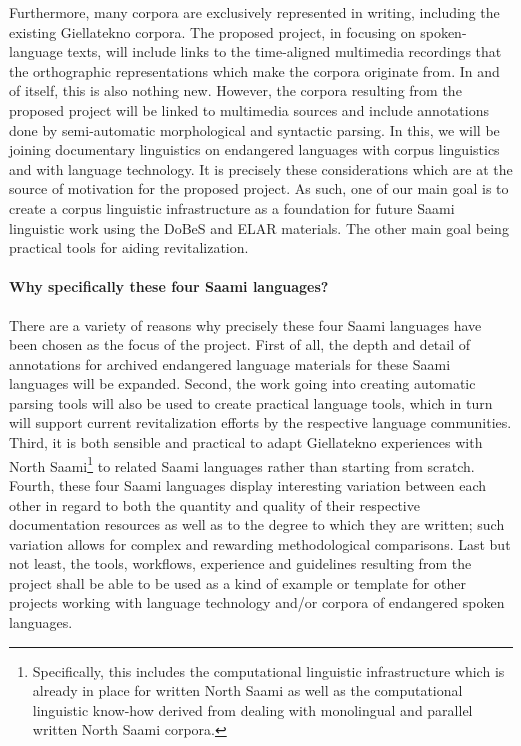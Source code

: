 \documentclass[a4paper,12pt]{article}
\begin{document}
Furthermore, many corpora are exclusively represented in writing, including the existing Giellatekno corpora. The proposed project, in focusing on spoken-language texts, will include links to the time-aligned multimedia recordings that the orthographic representations which make the corpora originate from. In and of itself, this is also nothing new. However, the corpora resulting from the proposed project will be linked to multimedia sources and include annotations done by semi-automatic morphological and syntactic parsing. In this, we will be joining documentary linguistics on endangered languages with corpus linguistics and with language technology. It is precisely these considerations which are at the source of motivation for the proposed project. As such, one of our main goal is to create a corpus linguistic infrastructure as a foundation for future Saami linguistic work using the DoBeS and ELAR materials. The other main goal being practical tools for aiding revitalization.

\paragraph{Why specifically these four Saami languages?}
There are a variety of reasons why precisely these four Saami languages have been chosen as the focus of the project. First of all, the depth and detail of annotations for archived endangered language materials for these Saami languages will be expanded. Second, the work going into creating automatic parsing tools will also be used to create practical language tools, which in turn will support current revitalization efforts by the respective language communities. Third, it is both sensible and practical to adapt Giellatekno experiences with North Saami\footnote{Specifically, this includes the computational linguistic infrastructure which is already in place for written North Saami as well as the computational linguistic know-how derived from dealing with monolingual and parallel written North Saami corpora.} to related Saami languages rather than starting from scratch. Fourth, these four Saami languages display interesting variation between each other in regard to both the quantity and quality of their respective documentation resources as well as to the degree to which they are written; such variation allows for complex and rewarding methodological comparisons. Last but not least, the tools, workflows, experience and guidelines resulting from the project shall be able to be used as a kind of example or template for other projects working with language technology and/or corpora of endangered spoken languages.
\end{document}
